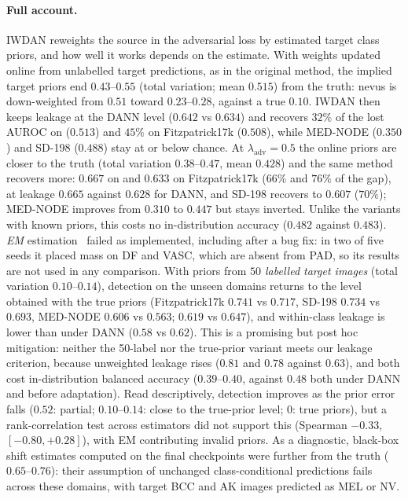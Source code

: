 \documentclass{midl}
\newcommand{\lam}{\lambda_{\mathrm{adv}}}
\begin{document}
\paragraph{Full account.} IWDAN reweights the source in the adversarial loss
by estimated target class priors, and how well it works depends on the estimate.
With weights updated online from unlabelled target predictions, as in the original method,
the implied target priors end $0.43$--$0.55$ (total variation; mean $0.515$) from the truth: nevus is
down-weighted from $0.51$ toward $0.23$--$0.28$, against a true $0.10$. IWDAN then keeps leakage at the DANN level ($0.642$ vs $0.634$) and recovers $32\%$ of the lost AUROC on
\texttt{} ($0.513$) and $45\%$ on Fitzpatrick17k ($0.508$), while MED-NODE
($0.350$) and SD-198 ($0.488$) stay at or below chance. At $\lam=0.5$ the online priors are closer to the truth (total variation $0.38$--$0.47$,
mean $0.428$) and the same method recovers more: $0.667$ on \texttt{} and $0.633$ on Fitzpatrick17k ($66\%$ and $76\%$ of
the gap), at leakage $0.665$ against $0.628$ for DANN, and SD-198 recovers to $0.607$ ($70\%$);
MED-NODE improves from $0.310$ to $0.447$ but stays inverted. Unlike the variants with known
priors, this costs no in-distribution accuracy ($0.482$ against $0.483$). \emph{EM} estimation~\cite{saerens2002} failed as implemented, including after a bug fix:
in two of five seeds it placed mass on DF and VASC, which are absent from PAD, so its results
are not used in any comparison. With priors from \emph{$50$ labelled target images} (total variation
$0.10$--$0.14$), detection on the unseen domains returns to the level obtained with the true
priors (Fitzpatrick17k $0.741$ vs $0.717$, SD-198 $0.734$ vs $0.693$, MED-NODE $0.606$ vs $0.563$;
\texttt{} $0.619$ vs $0.647$), and within-class leakage is lower than under DANN
($0.58$ vs $0.62$). This is a promising but post hoc mitigation: neither the 50-label nor the true-prior
variant meets our leakage criterion, because unweighted leakage rises ($0.81$ and $0.78$
against $0.63$), and both cost in-distribution balanced accuracy ($0.39$--$0.40$, against
$0.48$ both under DANN and before adaptation). Read descriptively, detection improves as the prior error falls ($0.52$:
partial; $0.10$--$0.14$: close to the true-prior level; $0$: true priors), but a rank-correlation test
across estimators did not support this (Spearman $-0.33$, $[-0.80, +0.28]$), with EM
contributing invalid priors. As a diagnostic, black-box shift estimates computed on the final checkpoints were further
from the truth ($0.65$--$0.76$): their assumption of unchanged class-conditional predictions
fails across these domains, with target BCC and AK images predicted as MEL or NV.
\end{document}
